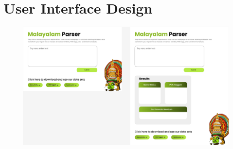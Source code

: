 \documentclass[12pt,a4paper,titlepage]{report}
\begin{document}
	
	
	
	
	\section{User Interface Design}
	
	\begin{figure}[H]
		\centering
		\includegraphics[width=16cm]{./ui.png}
		
	\end{figure}
	
\end{document}
